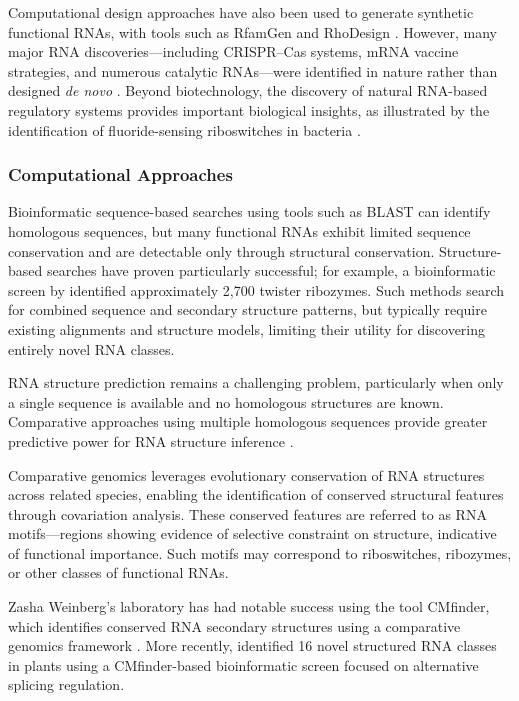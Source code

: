 \documentclass{article}
\begin{document}
Computational design approaches have also been used to generate synthetic functional RNAs, with tools such as RfamGen and RhoDesign \parencite{Sumi2024}.
However, many major RNA discoveries—including CRISPR--Cas systems, mRNA vaccine strategies, and numerous catalytic RNAs—were identified in nature rather than designed \emph{de novo} \parencite{Micura2020, Barrangou2007}.
Beyond biotechnology, the discovery of natural RNA-based regulatory systems provides important biological insights, as illustrated by the identification of fluoride-sensing riboswitches in bacteria \parencite{Breaker2012}.

\subsubsection*{Computational Approaches}

Bioinformatic sequence-based searches using tools such as BLAST can identify homologous sequences, but many functional RNAs exhibit limited sequence conservation and are detectable only through structural conservation.
Structure-based searches have proven particularly successful; for example, a bioinformatic screen by \textcite{Roth2014} identified approximately 2,700 twister ribozymes.
Such methods search for combined sequence and secondary structure patterns, but typically require existing alignments and structure models, limiting their utility for discovering entirely novel RNA classes.

RNA structure prediction remains a challenging problem, particularly when only a single sequence is available and no homologous structures are known.
Comparative approaches using multiple homologous sequences provide greater predictive power for RNA structure inference \parencite{Kagaya2026}.

Comparative genomics leverages evolutionary conservation of RNA structures across related species, enabling the identification of conserved structural features through covariation analysis.
These conserved features are referred to as RNA motifs—regions showing evidence of selective constraint on structure, indicative of functional importance.
Such motifs may correspond to riboswitches, ribozymes, or other classes of functional RNAs.

Zasha Weinberg's laboratory has had notable success using the tool CMfinder, which identifies conserved RNA secondary structures using a comparative genomics framework \parencite{Yao2006}.
More recently, \textcite{Sack2025} identified 16 novel structured RNA classes in plants using a CMfinder-based bioinformatic screen focused on alternative splicing regulation.
\end{document}

